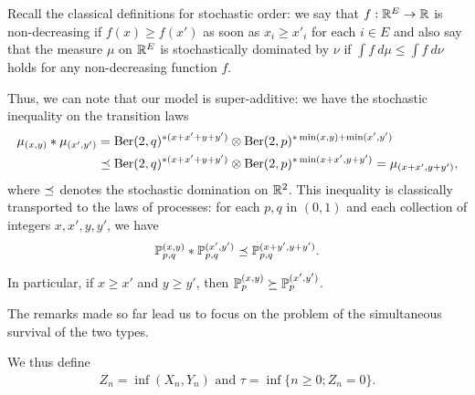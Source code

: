 Recall the classical definitions for stochastic order: we say that $f:\mathbb{R}^E\to \mathbb{R}$ is non-decreasing if $f(x)\ge f(x')$ as soon as $x_i\ge x'_i$ for each $i\in E$ and also say that the measure $\mu$ on $\mathbb{R}^E$ is stochastically dominated by $\nu$
if $\int f\ d\mu\le \int f\ d\nu$ holds for any non-decreasing function $f$.

Thus, we can note that our model is super-additive: we have the stochastic inequality on the transition laws
\begin{align*}
  \mu_{(x,y)}* \mu_{(x',y')}&=\text{Ber}(2,q)^{*(x+x'+y+y')}\otimes \text{Ber}(2,p)^{*\min(x,y)+\min(x',y')}\\
  &\preceq\text{Ber}(2,q)^{*(x+x'+y+y')}\otimes\text{Ber}(2,p)^{*\min(x+x',y+y')}= \mu_{(x+x',y+y')},
\end{align*}
where $\preceq$ denotes the stochastic domination on $\mathbb{R}^2$.
This inequality is classically transported to the laws of processes: for each $p,q$ in $(0,1)$ and each collection of integers $x,x',y,y'$, we have 
\begin{align}
  \label{inegloi}
  \mathbb{P}_{p,q}^{(x,y)}*\mathbb{P}_{p,q}^{(x',y')}\preceq \mathbb{P}_{p,q}^{(x+y',y+y')}.
\end{align}

In particular, if $x\ge x'$ and $y\ge y'$, then $\mathbb{P}_p^{(x,y)}\succeq \mathbb{P}_p^{(x',y')}$.


The remarks made so far lead us to focus on the problem of the simultaneous survival of the two types.

We thus define
\begin{align*}
  Z_n=\inf(X_n,Y_n)\text{ and }\tau=\inf\{n\ge 0;Z_n=0\}.
\end{align*}  

\begin{comment}

$p_c=inf(X_n,Y_n)$ and $tau=inf(Z_n=0) $.

Then, we have

\begin{theo}
  \begin{itemize}
  \item $\frac12\le p_c<0,71$
  \item $\P^{(1,1)}_{p_c}(\tau=+\infty)=0$
  \end{itemize}
\end{theo}

Let us note $Z_n=min(X_n,Y_n)$, $Delta=(\{0\times})\cup(\N\times{0\})$ and $\tau'=inf\{n\ge 0; Z_n=0\}$.

It is easy to see that if $(x,y)\in\Delta$, then under $\P_p^{(x,y)}$,
$Y_n=0$ for all $n=1$, while $(X_n)$ is a Galton-Watson chain of reproduction law $\ber(2,p/2)$, which leads to $\tau<+infty$ almost surely.
Thus, with the strong Markov property, the events $\tau<+\infty}$ and 
$${$tau'<+\infty\}$ coincide to within one negligible, whatever the starting point.


In particular, if $\min(x,y)\ge N$, we have
\begin{align}
  \label{small}
  \P^{(x,y)}(\tau<+\infty)&\le \P^{(1,1)}(\tau<+\infty)^N
\end{align}
\end{comment}


